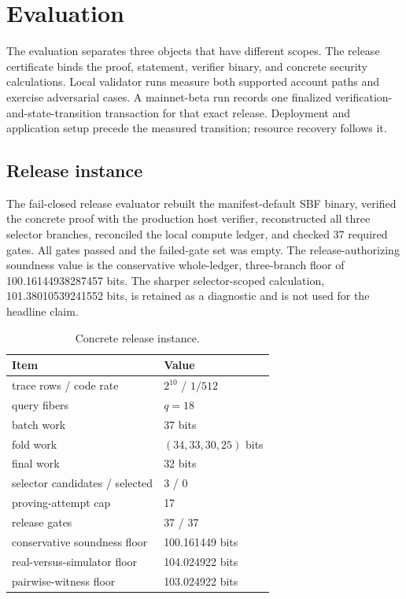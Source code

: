 \section{Evaluation}
\label{sec:evaluation}

The evaluation separates three objects that have different scopes.  The
release certificate binds the proof, statement, verifier binary, and concrete
security calculations.  Local validator runs measure both supported account
paths and exercise adversarial cases.  A mainnet-beta run records one
finalized verification-and-state-transition transaction for that exact
release.  Deployment and application setup precede the measured transition;
resource recovery follows it.

\subsection{Release instance}
\label{sec:evaluation-release}

The fail-closed release evaluator rebuilt the manifest-default SBF binary,
verified the concrete proof with the production host verifier, reconstructed
all three selector branches, reconciled the local compute ledger, and checked
37 required gates.  All gates passed and the failed-gate set was empty.  The
release-authorizing soundness value is the conservative whole-ledger,
three-branch floor of 100.16144938287457 bits.  The sharper selector-scoped
calculation, 101.38010539241552 bits, is retained as a diagnostic and is not
used for the headline claim.

\begin{table}[t]
  \centering
  \small
  \caption{Concrete \Profile{} release instance.}
  \label{tab:release-schedule}
  \begin{tabular}{l l}
    \toprule
    Item & Value \\
    \midrule
    trace rows / code rate & $2^{10}$ / $1/512$ \\
    query fibers & $q=18$ \\
    batch work & 37 bits \\
    fold work & $(34,33,30,25)$ bits \\
    final work & 32 bits \\
    selector candidates / selected & 3 / 0 \\
    proving-attempt cap & 17 \\
    release gates & 37 / 37 \\
    conservative soundness floor & 100.161449 bits \\
    real-versus-simulator floor & 104.024922 bits \\
    pairwise-witness floor & 103.024922 bits \\
    \bottomrule
  \end{tabular}
\end{table}

